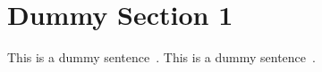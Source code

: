 \section{Dummy Section 1}
\label{sec:dummy1}

This is a dummy sentence~\cite{Authors14}. This is a dummy sentence~\cite{Authors14b}.
